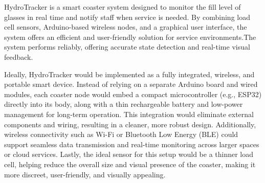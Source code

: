 HydroTracker is a smart coaster system designed to monitor the fill level of glasses in real time and notify staff when service is needed. By combining load cell sensors, Arduino-based wireless nodes, and a graphical user interface, the system offers an efficient and user-friendly solution for service environments.The system performs reliably, offering accurate state detection and real-time visual feedback. 

Ideally, HydroTracker would be implemented as a fully integrated, wireless, and portable smart device. Instead of relying on a separate Arduino board and wired modules, each coaster node would embed a compact microcontroller (e.g., ESP32) directly into its body, along with a thin rechargeable battery and low-power management for long-term operation. This integration would eliminate external components and wiring, resulting in a cleaner, more robust design. Additionally, wireless connectivity such as Wi-Fi or Bluetooth Low Energy (BLE) could support seamless data transmission and real-time monitoring across larger spaces or cloud services. Lastly, the ideal sensor for this setup would be a thinner load cell, helping reduce the overall size and visual presence of the coaster, making it more discreet, user-friendly, and visually appealing.